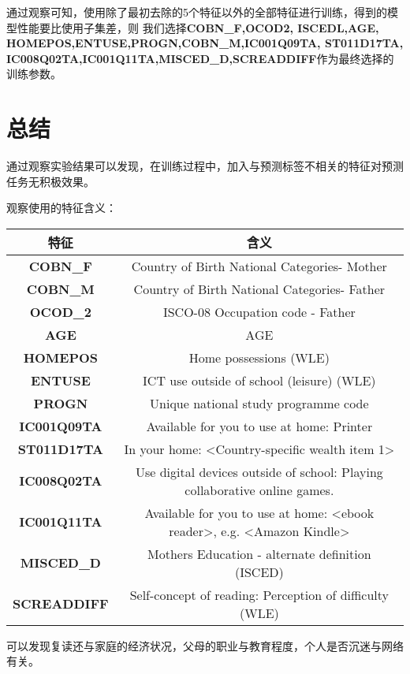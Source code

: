\documentclass[12pt, a4paper, oneside]{ctexart}
\begin{document}
通过观察可知，使用除了最初去除的5个特征以外的全部特征进行训练，得到的模型性能要比使用子集差，则
我们选择\textbf{COBN\_F,OCOD2, ISCEDL,AGE,\\HOMEPOS,ENTUSE,PROGN,COBN\_M,IC001Q09TA,
ST011D17TA,\\IC008Q02TA,IC001Q11TA,MISCED\_D,SCREADDIFF}作为最终选择的训练参数。

\section{总结}

通过观察实验结果可以发现，在训练过程中，加入与预测标签不相关的特征对预测任务无积极效果。

观察使用的特征含义：
\begin{table*}[h]
    \centering%
    \begin{tabular}{cc}%
    \toprule%
    特征&含义 \\
    \midrule%
    \textbf{COBN\_F} &Country of Birth National Categories- Mother\\
    \textbf{COBN\_M} &Country of Birth National Categories- Father\\
    \textbf{OCOD\_2} &ISCO-08 Occupation code - Father\\
    \textbf{AGE} &AGE\\
    \textbf{HOMEPOS} &Home possessions (WLE)\\
    \textbf{ENTUSE} &ICT use outside of school (leisure) (WLE)\\
    \textbf{PROGN} &Unique national study programme code\\
    \textbf{IC001Q09TA} &Available for you to use at home: Printer\\
    \textbf{ST011D17TA} &In your home: <Country-specific wealth item 1>\\
    \textbf{IC008Q02TA} &Use digital devices outside of school: Playing collaborative online games.\\
    \textbf{IC001Q11TA} &Available for you to use at home: <ebook reader>, e.g. <Amazon Kindle>\\
    \textbf{MISCED\_D} &Mothers Education - alternate definition (ISCED)\\
    \textbf{SCREADDIFF} &Self-concept of reading: Perception of difficulty (WLE)\\
    
    \bottomrule%
    \end{tabular}
\end{table*}
可以发现复读还与家庭的经济状况，父母的职业与教育程度，个人是否沉迷与网络有关。
\end{document}
